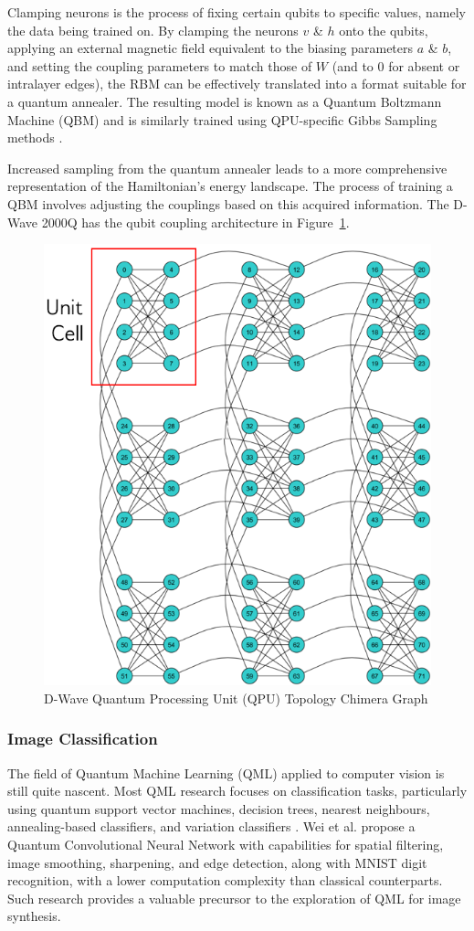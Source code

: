 \documentclass[%
 reprint,
 amsmath,amssymb,
 aps,
]{revtex4-2}
\begin{document}
Clamping neurons is the process of fixing certain qubits to specific values, namely the data being trained on. By clamping the neurons $v$ \& $h$ onto the qubits, applying an external magnetic field equivalent to the biasing parameters $a$ \& $b$, and setting the coupling parameters to match those of $W$ (and to 0 for absent or intralayer edges), the RBM can be effectively translated into a format suitable for a quantum annealer. The resulting model is known as a Quantum Boltzmann Machine (QBM) and is similarly trained using QPU-specific Gibbs Sampling methods \cite{dwavedocs}\cite{qpugibbs}.



Increased sampling from the quantum annealer leads to a more comprehensive representation of the Hamiltonian's energy landscape. The process of training a QBM involves adjusting the couplings based on this acquired information. The D-Wave 2000Q has the qubit coupling architecture in Figure~\ref{fig:chimera}.

\begin{figure}[h]
    \includegraphics[width=0.7\columnwidth]{chimera.png}
    \caption{\label{fig:chimera} D-Wave Quantum Processing Unit (QPU) Topology Chimera Graph \cite{dwavedocs}}
\end{figure}

\subsubsection{Image Classification}
The field of Quantum Machine Learning (QML) applied to computer vision is still quite nascent. Most QML research focuses on classification tasks, particularly using quantum support vector machines, decision trees, nearest neighbours, annealing-based classifiers, and variation classifiers \cite{classifiers}.  Wei et al. propose a Quantum Convolutional Neural Network with capabilities for spatial filtering, image smoothing, sharpening, and edge detection, along with MNIST digit recognition, with a lower computation complexity than classical counterparts\cite{quantumCNN}. Such research provides a valuable precursor to the exploration of QML for image synthesis.
\end{document}
